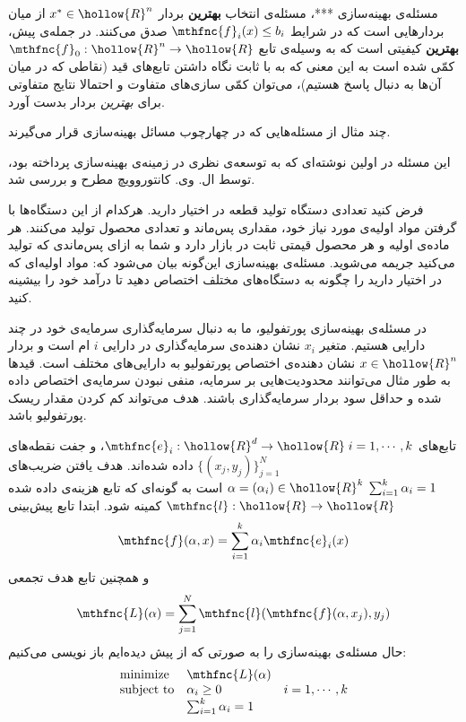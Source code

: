 
مسئله‌ی بهینه‌سازی ***، مسئله‌ی انتخاب 
\textbf{
بهترین
} 
بردار 
$x^* \in \hollow{R}^n$ 
از میان بردارهایی است که در شرایط 
$\mthfnc{f}_i(x) \leq b_i$ 
صدق می‌کنند. در جمله‌ی پیش، 
\textbf{
بهترین
} 
کیفیتی است که به وسیله‌ی تابع 
$\mthfnc{f}_0: \hollow{R}^n \rightarrow \hollow{R}$ 
کمّی شده است به این معنی که به با ثابت نگاه داشتن تابع‌های قید (نقاطی که در میان آن‌ها به دنبال پاسخ هستیم)، می‌توان کمّی سازی‌های متفاوت و احتمالا نتایج متفاوتی برای 
\emph{
بهترین
} 
بردار بدست آورد.

چند مثال از مسئله‌هایی که در چهارچوب مسائل بهینه‌سازی قرار می‌گیرند.

این مسئله در اولین نوشته‌ای که به توسعه‌ی نظری در زمینه‌ی بهینه‌سازی پرداخته بود، توسط ال. وی. کانتوروویچ
مطرح و بررسی شد.
\cite{kantorovich1960}


فرض کنید تعدادی دستگاه تولید قطعه در اختیار دارید. هرکدام از این دستگاه‌ها با گرفتن مواد اولیه‌ی مورد نیاز خود، مقداری پس‌ماند و تعدادی محصول تولید می‌کنند. هر ماده‌ی اولیه و هر محصول قیمتی ثابت در بازار دارد و شما به ازای پس‌ماندی که تولید می‌کنید جریمه می‌شوید. مسئله‌ی بهینه‌سازی این‌گونه بیان می‌شود که: مواد اولیه‌ای که در اختیار دارید را چگونه به دستگاه‌های مختلف اختصاص دهید تا درآمد خود را بیشینه کنید.


در مسئله‌ی بهینه‌سازی پورتفولیو، ما به دنبال سرمایه‌گذاری سرمایه‌ی
خود در چند دارایی
هستیم. متغیر 
$x_i$ 
نشان دهنده‌ی سرمایه‌گذاری در دارایی 
$i$
ام است و بردار 
$x \in \hollow{R}^n$ 
نشان دهنده‌ی اختصاص پورتفولیو به دارایی‌های مختلف است. قیدها به طور مثال می‌توانند محدودیت‌هایی بر سرمایه، منفی نبودن سرمایه‌ی اختصاص داده شده و حداقل سود بردار سرمایه‌گذاری باشند. هدف می‌تواند کم کردن مقدار ریسک
پورتفولیو باشد.


تابع‌های 
$\mthfnc{e}_i : \hollow{R}^d \rightarrow \hollow{R} \; i=1,\cdots,k$، 
و جفت نقطه‌های 
$\{ (x_j, y_j) \}^{N}_{j=1}$ 
داده شده‌اند. هدف یافتن ضریب‌های 
$\alpha = (\alpha_i) \in \hollow{R}^k \; \sum^{k}_{i=1} \alpha_i = 1$ 
است به گونه‌ای که تابع هزینه‌ی داده شده 
$\mthfnc{l} : \hollow{R} \rightarrow \hollow{R}$ 
کمینه شود. ابتدا تابع پیش‌بینی
\[
\mthfnc{f}(\alpha, x) = \sum^{k}_{i=1} \alpha_i \mthfnc{e}_i(x)
\]
و همچنین تابع هدف تجمعی 
\[
\mthfnc{L}(\alpha) = \sum^{N}_{j=1} \mthfnc{l} ( \mthfnc{f}(\alpha, x_j) , y_j )
\]
حال مسئله‌ی بهینه‌سازی را به صورتی که از پیش دیده‌ایم باز نویسی می‌کنیم:
\[
\begin{array}{lll}
\mbox{minimize} & \mthfnc{L}(\alpha) & \\
\mbox{subject to} & \alpha_i \geq 0 & i = 1,\cdots, k\\
& \sum^{k}_{i=1} \alpha_i = 1 & 
\end{array}
\]

